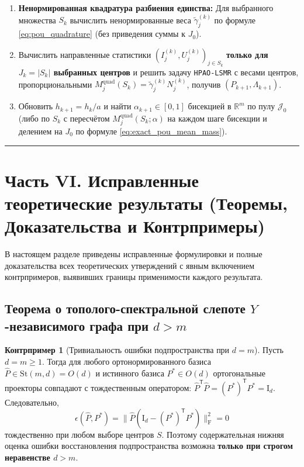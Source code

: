 \documentclass[11pt,a4paper]{article}
\newcommand{\R}{\mathbb{R}}
\newcommand{\Id}{\mathrm{I}}
\newcommand{\T}{^{\mathsf{T}}}
\newcommand{\F}{_{\mathrm{F}}}
\newcommand{\St}{\mathrm{St}}
\newcommand{\PEDRs}{P^{*}}
\newcommand{\JJJ}{\mathcal{J}}
\theoremstyle{definition}
\newtheorem{counterexample}[theorem]{Контрпример}
\theoremstyle{remark}
\begin{document}
\begin{enumerate}
\begin{enumerate}
        \begin{equation}\label{eq:strict_stop_J}
            J_k \ge J_{\min}(d,m) = \max\bigl(4m, \min(J_0, 2d)\bigr), \qquad \mathcal{R}_{\mathrm{info}}(S_{J_k}) \ge 1 - \delta_{\mathrm{info}}, \qquad \mathcal{R}_{\mathrm{mass}}^{(k)}(S_{J_k}) \ge 1 - \delta_{\mathrm{mass}}.
        \end{equation}
        \item \textbf{Ненормированная квадратура разбиения единства:} Для выбранного множества $S_k$ вычислить ненормированные веса $\tilde{\gamma}_j^{(k)}$ по формуле \eqref{eq:pou_quadrature} (без приведения суммы к $J_0$).
        \item Вычислить направленные статистики $(I_j^{(k)}, U_j^{(k)})_{j \in S_k}$ \textbf{только для $J_k = |S_k|$ выбранных центров} и решить задачу \texttt{HPAO-LSMR} с весами центров, пропорциональными $M_j^{\mathrm{quad}}(S_k) = \tilde{\gamma}_j^{(k)} N_j^{(k)}$, получив $(P_{k+1}, \Lambda_{k+1})$.
        \item Обновить $h_{k+1} = h_k / a$ и найти $\alpha_{k+1} \in [0,1]$ бисекцией в $\R^m$ по пулу $\JJJ_0$ (либо по $S_k$ с пересчётом $M_j^{\mathrm{quad}}(S_k; \alpha)$ на каждом шаге бисекции и делением на $J_0$ по формуле \eqref{eq:exact_pou_mean_mass}).
    \end{enumerate}
\end{enumerate}
\noindent\rule{\textwidth}{0.8pt}

\section{Часть VI. Исправленные теоретические результаты (Теоремы, Доказательства и Контрпримеры)}
\label{sec:part6}

В настоящем разделе приведены исправленные формулировки и полные доказательства всех теоретических утверждений с явным включением контрпримеров, выявивших границы применимости каждого результата.

\subsection{Теорема о тополого-спектральной слепоте $Y$-независимого графа при $d > m$}

\begin{counterexample}[Тривиальность ошибки подпространства при $d = m$]\label{cex:d_eq_m}
Пусть $d = m \ge 1$. Тогда для любого ортонормированного базиса $\hat{P} \in \St(m,d) = O(d)$ и истинного базиса $\PEDRs \in O(d)$ ортогональные проекторы совпадают с тождественным оператором: $\hat{P}\T \hat{P} = (\PEDRs)\T \PEDRs = \Id_d$. Следовательно,
\[
    \epsilon(\hat{P}, \PEDRs) = \bigl\|\hat{P}(\Id_d - (\PEDRs)\T \PEDRs)\bigr\|\F^2 = 0
\]
тождественно при любом выборе центров $S$. Поэтому содержательная нижняя оценка ошибки восстановления подпространства возможна \textbf{только при строгом неравенстве $d > m$}.
\end{counterexample}
\end{document}
